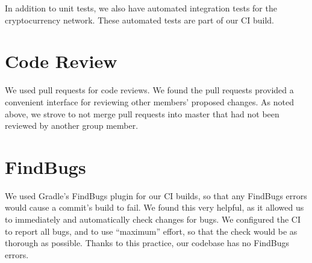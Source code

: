 \documentclass[a4paper,12pt]{article}
\begin{document}
In addition to unit tests, we also have automated integration tests for the cryptocurrency network. These automated tests are part of our CI build.

\section{Code Review}

We used pull requests for code reviews. We found the pull requests provided a convenient interface for reviewing other members' proposed changes. As noted above, we strove to not merge pull requests into master that had not been reviewed by another group member.

\section{FindBugs}

We used Gradle's FindBugs plugin for our CI builds, so that any FindBugs errors would cause a commit's build to fail. We found this very helpful, as it allowed us to immediately and automatically check changes for bugs. We configured the CI to report all bugs, and to use ``maximum'' effort, so that the check would be as thorough as possible. Thanks to this practice, our codebase has no FindBugs errors.
\end{document}
